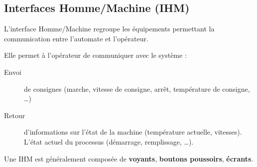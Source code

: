 \subsection{Interfaces Homme/Machine (IHM)}
L'interface Homme/Machine regroupe les équipements permettant la communication entre l'automate et l'opérateur.

 Elle permet à l'opérateur de communiquer avec le système :
 \begin{description}
   \item [Envoi] de consignes (marche, vitesse de consigne, arrêt, température de consigne, \dots)
   \item [Retour] d'informations sur l'état de la machine (température actuelle, vitesses). L'état actuel du processus (démarrage, remplissage, \dots).
 \end{description}

 Une IHM est généralement composée de \textbf{voyants}, \textbf{boutons poussoirs}, \textbf{écrants}.
